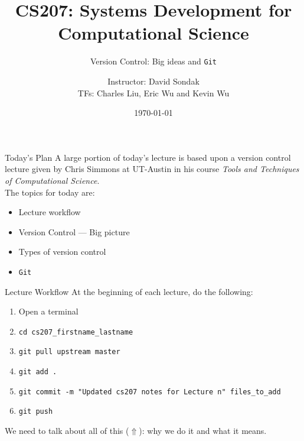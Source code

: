 \documentclass[onlymath, nologo]{beamer}
\author[]{Instructor:  David Sondak \\ TFs:  Charles Liu, Eric Wu and Kevin Wu}
\title{CS207: Systems Development for Computational Science}
\subtitle{Version Control:  Big ideas and \texttt{Git}}
\institute{Harvard University \\ 
           Institute for Applied Computational Science}
\date{\today}
\begin{document}
\bgroup
\makeatletter
{}
\makeatother

  \begin{frame}
    \titlepage
  \end{frame}
  \egroup
  
  \setcounter{framenumber}{0}

  \begin{frame}{Today's Plan}
    A large portion of today's lecture is based upon a version control lecture given by 
    Chris Simmons at UT-Austin in his course \textit{Tools and Techniques of Computational Science}. \\[1.0em]
    The topics for today are:
    \begin{itemize}
      \item Lecture workflow
      \item Version Control --- Big picture 
      \item Types of version control 
      \item \texttt{Git}
    \end{itemize}
  \end{frame}

  \begin{frame}{Lecture Workflow}
    At the beginning of each lecture, do the following:
    \begin{enumerate}
      \item Open a terminal 
      \item \texttt{cd cs207\_firstname\_lastname}
      \item \texttt{git pull upstream master} 
      \item \texttt{git add .} 
      \item \texttt{git commit -m "Updated cs207 notes for Lecture n" files\_to\_add}
      \item \texttt{git push}
    \end{enumerate}
    We need to talk about all of this ($\Uparrow$): why we do it and what it means.
  \end{frame}
\end{document}
